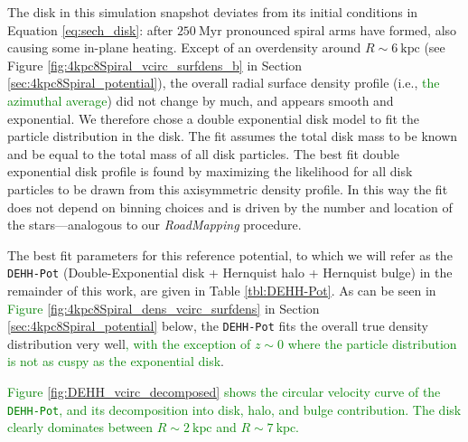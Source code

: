 \documentclass[iop,revtex4,numberedappendix,appendixfloats]{emulateapj}
\newcommand{\RM}{{\sl RoadMapping}}
\newcommand{\NEW}[1]{\textcolor{Green}{#1}}
\newcommand{\OLD}[1]{}
\begin{document}
The disk in this simulation snapshot deviates from its initial conditions in Equation \eqref{eq:sech_disk}: after $250~\text{Myr}$ pronounced spiral arms have formed, also causing some in-plane heating. Except of an overdensity around $R\sim6~\text{kpc}$ (see Figure \ref{fig:4kpc8Spiral_vcirc_surfdens_b} in Section \ref{sec:4kpc8Spiral_potential}), the overall radial surface density profile (i.e., \OLD{when averaging over the $\phi$ coordinate}\NEW{the azimuthal average}) did not change by much, and appears smooth and exponential. We therefore chose a double exponential disk model to fit the particle distribution in the disk. The fit assumes the total disk mass to be known and be equal to the total mass of all disk particles. The best fit double exponential disk profile is found by maximizing the likelihood for all disk particles to be drawn from this axisymmetric density profile. In this way the fit does not depend on binning choices and is driven by the number and location of the stars---analogous to our \RM{} procedure. 

The best fit parameters for this reference potential, to which we will refer as the \texttt{DEHH-Pot} (Double-Exponential disk + Hernquist halo + Hernquist bulge) in the remainder of this work, are given in Table \ref{tbl:DEHH-Pot}. As can be seen in \OLD{Figures \ref{fig:4kpc8Spiral_density} and \ref{fig:4kpc8Spiral_vcirc_surfdens}}\NEW{Figure \ref{fig:4kpc8Spiral_dens_vcirc_surfdens}} in Section \ref{sec:4kpc8Spiral_potential} below, the \texttt{DEHH-Pot} fits the overall true density distribution very well\NEW{, with the exception of $z\sim0$ where the particle distribution is not as cuspy as the exponential disk}. \OLD{Its density profile might be a little steeper around $z\sim 0$ than the actual particle distribution, but this should not affect the overall discussion, as the radial density, surface density and disk-to-halo ratio profiles are so well reproduced.}

\NEW{Figure \ref{fig:DEHH_vcirc_decomposed} shows the circular velocity curve of the \texttt{DEHH-Pot}, and its decomposition into disk, halo, and bulge contribution. The disk clearly dominates between $R\sim2~\text{kpc}$ and $R\sim7~\text{kpc}$.}
\end{document}
